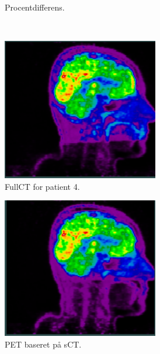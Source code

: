 \begin{figure}
\begin{subfigure}{0.3\textwidth}
        \caption{Procentdifferens.}
        \label{col:loocv_pet_pat3_pd}
    \end{subfigure}\\
    \begin{subfigure}{0.3\textwidth}
        \centering
        \includegraphics[width=0.75\textwidth]{colager/loocv_pet/loocv_010960_pet_ct.png}
        \caption{FullCT for patient 4.}
        \label{col:loocv_pet_pat4_ct}
    \end{subfigure}\hfill
    \begin{subfigure}{0.3\textwidth}
        \centering
        \includegraphics[width=0.75\textwidth]{colager/loocv_pet/loocv_010960_pet_sct.png}
        \caption{PET baseret på sCT.}
        \label{col:loocv_pet_pat4_sct}
    \end{subfigure}\hfill
    \begin{subfigure}{0.3\textwidth}

\end{subfigure}
\end{figure}
